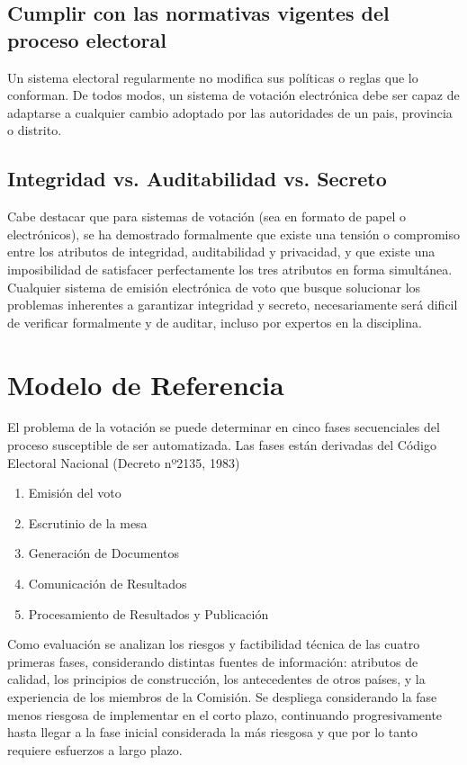 \subsection{Cumplir con las normativas vigentes del proceso electoral}
Un sistema electoral regularmente no modifica sus políticas o reglas que lo conforman. De todos modos, un sistema de votación electrónica debe ser capaz de adaptarse a cualquier cambio adoptado por las autoridades de un pais, provincia o distrito.

\subsection{Integridad vs. Auditabilidad vs. Secreto}
Cabe destacar que para sistemas de votación (sea en formato de papel o electrónicos), se ha demostrado formalmente que existe una tensión o compromiso entre los atributos de integridad, auditabilidad y privacidad, y que existe una imposibilidad de satisfacer perfectamente los tres atributos en forma simultánea.\newline
Cualquier sistema de emisión electrónica de voto que busque solucionar los problemas inherentes a garantizar integridad y secreto, necesariamente será dificil de verificar formalmente y de auditar, incluso por expertos en la disciplina.

\section{Modelo de Referencia}
El problema de la votación se puede determinar en cinco fases secuenciales del proceso susceptible de ser automatizada. Las fases están derivadas del Código Electoral Nacional (Decreto nº2135, 1983)
\begin{enumerate}
    \item Emisión del voto
    \item Escrutinio de la mesa
    \item Generación de Documentos
    \item Comunicación de Resultados
    \item Procesamiento de Resultados y Publicación
\end{enumerate}

Como evaluación se analizan los riesgos y factibilidad técnica de las cuatro primeras fases, considerando distintas fuentes de información: atributos de calidad, los principios de construcción, los antecedentes de otros países, y la experiencia de los miembros de la Comisión.\newline
Se despliega considerando la fase menos riesgosa de implementar en el corto plazo, continuando progresivamente hasta llegar a la fase inicial considerada la más riesgosa y que por lo tanto requiere esfuerzos a largo plazo.
